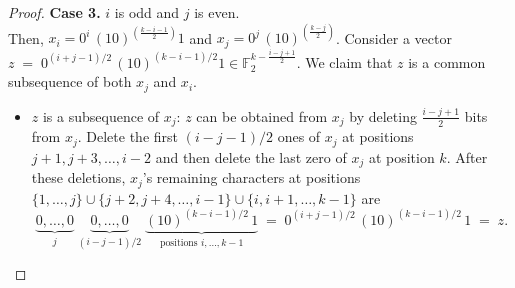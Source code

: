 \documentclass[10pt,a4paper]{amsart}
\begin{document}
\begin{proof}
        
        




    \noindent\textbf{Case 3.} $i$ is odd and $j$ is even.\\
    Then, $x_i = 0^i\,(10)^{(\frac{k-i-1}{2})}1$ and $x_j = 0^j\,(10)^{(\frac{k-j}{2})}$.
    Consider a vector $z \;=\; 0^{(i+j-1)/2}\,(10)^{(k-i-1)/2}1 \in \mathbb{F}_2^{k - \frac{i-j+1}{2}}$. We claim that $z$ is a common subsequence of both $x_j$ and $x_i$.
    
    \medskip
    \begin{itemize}
    \item {$z$ is a subsequence of $x_j$:}      
     $z$ can be obtained from $x_j$ by deleting $\frac{i-j+1}{2}$ bits from $x_j$. Delete the first $(i - j - 1)/2$ ones of $x_j$ at positions $j+1, j+3, \ldots, i-2$ and then delete the last zero of $x_j$ at position $k$. After these deletions, $x_j$'s remaining characters at positions $\{1, \ldots, j\} \cup \{j+2, j+4, \ldots, i-1\} \cup \{i, i+1, \ldots, k-1\}$ are
    \[
    \underbrace{0, \ldots, 0}_{j}\;\underbrace{0, \ldots, 0}_{(i-j-1)/2}\;\underbrace{(10)^{(k-i-1)/2}\,1}_{\text{positions } i, \ldots, k-1}
    \;=\; 0^{(i+j-1)/2}\,(10)^{(k-i-1)/2}\,1 \;=\; z.
    \] 


\end{itemize}
\end{proof}
\end{document}
